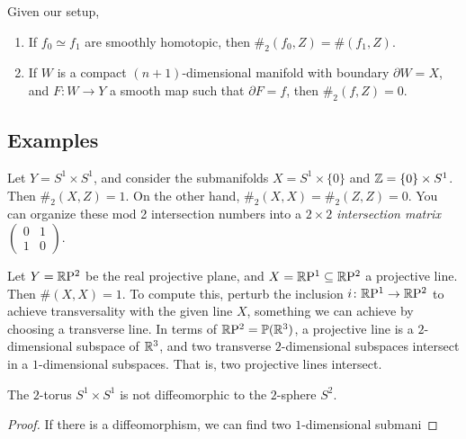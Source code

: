 \begin{prop}
    Given our setup,
    \begin{enumerate}[label=(\arabic*)]
    \setlength\itemsep{-.2em}
\item If $f_0 \simeq f_1$ are smoothly homotopic, then $\#_2(f_0,Z)=\#(f_1,Z)$.
\item If $W$ is a compact $(n+1)$-dimensional manifold with boundary $\partial W=X$, and $F \colon W \to Y$ a smooth map such that $\partial F=f$, then $\#_2(f,Z)=0$.
    \end{enumerate}
\end{prop}
\subsection{Examples}
\begin{example}
    Let $Y= S^1 \times S^1 $, and consider the submanifolds $X=S^1 \times \{0\} $ and $\mathbb{Z}=\{0\} \times S^1 $. Then $\#_2(X,Z)=1$. On the other hand, $\#_2(X,X)=\#_2(Z,Z)=0$. You can organize these mod 2 intersection numbers into a $2\times 2$ \emph{intersection matrix} $\left( 
    \begin{smallmatrix}
        0 & 1 \\ 1 & 0
    \end{smallmatrix}\right) $.
\end{example}
\begin{example}
    Let $Y=\mathbb{R} \mathrm P^2$ be the real projective plane, and $X=\mathbb{R} \mathrm P^1 \subseteq \mathbb{R} \mathrm P^2$ a projective line. Then $\# (X,X)=1$. To compute this, perturb the inclusion $i \colon \mathbb{R} \mathrm P^1 \to \mathbb{R} \mathrm P^2$ to achieve transversality with the given line $X$, something we can achieve by choosing a transverse line. In terms of $\mathbb{R} \mathrm P^2=\mathbb P(\mathbb{R}^3)$, a projective line is a $2$-dimensional subspace of $\mathbb{R}^3$, and two transverse $2$-dimensional subspaces intersect in a $1$-dimensional subspaces. That is, two projective lines intersect.
\end{example}
\begin{theorem}
    The $2$-torus $S^1 \times S^1 $ is not diffeomorphic to the $2$-sphere $S^2$.
\end{theorem}
\begin{proof}
    If there is a diffeomorphism, we can find two $1$-dimensional submani
\end{proof}
